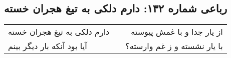 \begin{center}
\section*{رباعی شماره ۱۳۲: دارم دلکی به تیغ هجران خسته}
\label{sec:132}
\begin{longtable}{l p{0.5cm} r}
دارم دلکی به تیغ هجران خسته
&&
از یار جدا و با غمش پیوسته
\\
آیا بود آنکه بار دیگر بینم
&&
با یار نشسته و ز غم وارسته؟
\\
\end{longtable}
\end{center}
